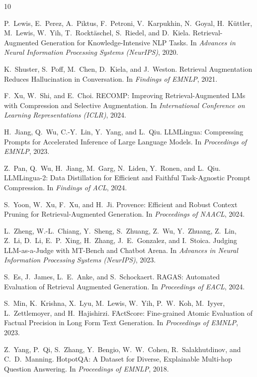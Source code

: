 \documentclass[11pt,a4paper]{article}
\begin{document}
\begin{thebibliography}{10}

P.\ Lewis, E.\ Perez, A.\ Piktus, F.\ Petroni, V.\ Karpukhin, N.\ Goyal, H.\ K\"{u}ttler, M.\ Lewis, W.\ Yih, T.\ Rockt\"{a}schel, S.\ Riedel, and D.\ Kiela.
\newblock Retrieval-Augmented Generation for Knowledge-Intensive NLP Tasks.
\newblock In \textit{Advances in Neural Information Processing Systems (NeurIPS)}, 2020.

K.\ Shuster, S.\ Poff, M.\ Chen, D.\ Kiela, and J.\ Weston.
\newblock Retrieval Augmentation Reduces Hallucination in Conversation.
\newblock In \textit{Findings of EMNLP}, 2021.

F.\ Xu, W.\ Shi, and E.\ Choi.
\newblock RECOMP: Improving Retrieval-Augmented LMs with Compression and Selective Augmentation.
\newblock In \textit{International Conference on Learning Representations (ICLR)}, 2024.

H.\ Jiang, Q.\ Wu, C.-Y.\ Lin, Y.\ Yang, and L.\ Qiu.
\newblock LLMLingua: Compressing Prompts for Accelerated Inference of Large Language Models.
\newblock In \textit{Proceedings of EMNLP}, 2023.

Z.\ Pan, Q.\ Wu, H.\ Jiang, M.\ Garg, N.\ Liden, Y.\ Ronen, and L.\ Qiu.
\newblock LLMLingua-2: Data Distillation for Efficient and Faithful Task-Agnostic Prompt Compression.
\newblock In \textit{Findings of ACL}, 2024.

S.\ Yoon, W.\ Xu, F.\ Xu, and H.\ Ji.
\newblock Provence: Efficient and Robust Context Pruning for Retrieval-Augmented Generation.
\newblock In \textit{Proceedings of NAACL}, 2024.

L.\ Zheng, W.-L.\ Chiang, Y.\ Sheng, S.\ Zhuang, Z.\ Wu, Y.\ Zhuang, Z.\ Lin, Z.\ Li, D.\ Li, E.\ P.\ Xing, H.\ Zhang, J.\ E.\ Gonzalez, and I.\ Stoica.
\newblock Judging LLM-as-a-Judge with MT-Bench and Chatbot Arena.
\newblock In \textit{Advances in Neural Information Processing Systems (NeurIPS)}, 2023.

S.\ Es, J.\ James, L.\ E.\ Anke, and S.\ Schockaert.
\newblock RAGAS: Automated Evaluation of Retrieval Augmented Generation.
\newblock In \textit{Proceedings of EACL}, 2024.

S.\ Min, K.\ Krishna, X.\ Lyu, M.\ Lewis, W.\ Yih, P.\ W.\ Koh, M.\ Iyyer, L.\ Zettlemoyer, and H.\ Hajishirzi.
\newblock FActScore: Fine-grained Atomic Evaluation of Factual Precision in Long Form Text Generation.
\newblock In \textit{Proceedings of EMNLP}, 2023.

Z.\ Yang, P.\ Qi, S.\ Zhang, Y.\ Bengio, W.\ W.\ Cohen, R.\ Salakhutdinov, and C.\ D.\ Manning.
\newblock HotpotQA: A Dataset for Diverse, Explainable Multi-hop Question Answering.
\newblock In \textit{Proceedings of EMNLP}, 2018.

\end{thebibliography}
\end{document}
